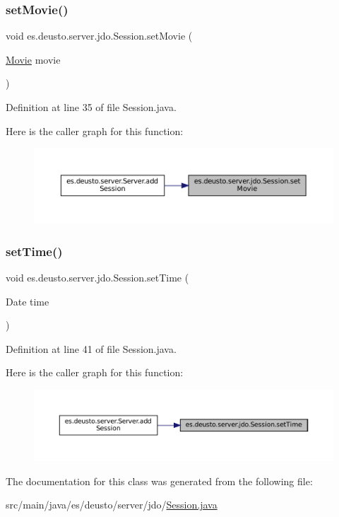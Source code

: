 \subsubsection{\texorpdfstring{setMovie()}{setMovie()}}
{\footnotesize\ttfamily void es.\+deusto.\+server.\+jdo.\+Session.\+set\+Movie (\begin{DoxyParamCaption}\item[{\mbox{\hyperlink{classes_1_1deusto_1_1server_1_1jdo_1_1_movie}{Movie}}}]{movie }\end{DoxyParamCaption})}



Definition at line 35 of file Session.\+java.

Here is the caller graph for this function\+:
\nopagebreak
\begin{figure}[H]
\begin{center}
\leavevmode
\includegraphics[width=350pt]{classes_1_1deusto_1_1server_1_1jdo_1_1_session_ae4e58ddc0ec278e4f16eba20755b5ceb_icgraph}
\end{center}
\end{figure}
\mbox{\label{classes_1_1deusto_1_1server_1_1jdo_1_1_session_a24a0fb018aaa31864d30260cfadfc1f0}} 
\subsubsection{\texorpdfstring{setTime()}{setTime()}}
{\footnotesize\ttfamily void es.\+deusto.\+server.\+jdo.\+Session.\+set\+Time (\begin{DoxyParamCaption}\item[{Date}]{time }\end{DoxyParamCaption})}



Definition at line 41 of file Session.\+java.

Here is the caller graph for this function\+:
\nopagebreak
\begin{figure}[H]
\begin{center}
\leavevmode
\includegraphics[width=350pt]{classes_1_1deusto_1_1server_1_1jdo_1_1_session_a24a0fb018aaa31864d30260cfadfc1f0_icgraph}
\end{center}
\end{figure}


The documentation for this class was generated from the following file\+:\begin{DoxyCompactItemize}
\item 
src/main/java/es/deusto/server/jdo/\mbox{\hyperlink{_session_8java}{Session.\+java}}\end{DoxyCompactItemize}
